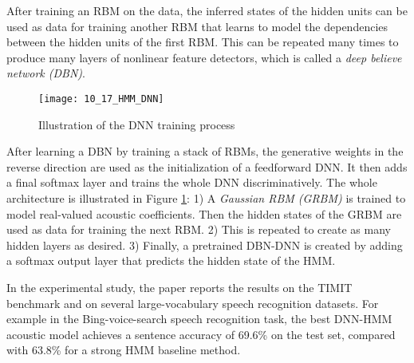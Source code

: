 After training an RBM on the data, the inferred states of the hidden units can be used as data for training another RBM that learns to model the dependencies between the hidden units of the first RBM. This can be repeated many times to produce many layers of nonlinear feature detectors, which is called a \emph{deep believe network (DBN)}.

\begin{figure}[htbp]
  \centering
  \texttt{[image: 10\_17\_HMM\_DNN]}\\
  \caption{Illustration of the DNN training process}\label{fig:HMM_DNN}
\end{figure}

After learning a DBN by training a stack of RBMs, the generative weights in the reverse direction are used as the initialization of a feedforward DNN. It then adds a final softmax layer and trains the whole DNN discriminatively. The whole architecture is illustrated in Figure \ref{fig:HMM_DNN}: 1) A \emph{Gaussian RBM (GRBM)} is trained to model real-valued acoustic coefficients. Then the hidden states of the GRBM are used as data for training the next RBM. 2) This is repeated to create as many hidden layers as desired. 3) Finally, a pretrained DBN-DNN is created by adding a softmax output layer that predicts the hidden state of the HMM.

In the experimental study, the paper reports the results on the TIMIT benchmark and on several large-vocabulary speech recognition datasets. For example in the Bing-voice-search speech recognition task, the best DNN-HMM acoustic model achieves a sentence accuracy of 69.6\% on the test set, compared with 63.8\% for a strong HMM baseline method. 